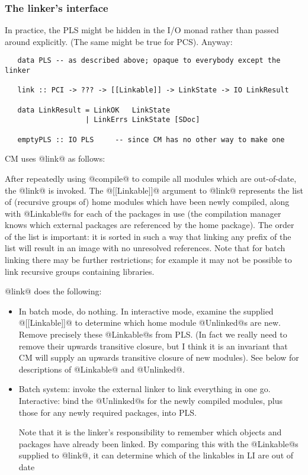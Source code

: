 \documentclass[11pt]{article}
\begin{document}
\subsubsection{The linker's interface}

In practice, the PLS might be hidden in the I/O monad rather
than passed around explicitly.  (The same might be true for PCS).
Anyway:

\begin{verbatim}
   data PLS -- as described above; opaque to everybody except the linker

   link :: PCI -> ??? -> [[Linkable]] -> LinkState -> IO LinkResult

   data LinkResult = LinkOK   LinkState
                   | LinkErrs LinkState [SDoc]

   emptyPLS :: IO PLS     -- since CM has no other way to make one
\end{verbatim}

CM uses @link@ as follows:

After repeatedly using @compile@ to compile all modules which are
out-of-date, the @link@ is invoked.  The @[[Linkable]]@ argument to
@link@ represents the list of (recursive groups of) home modules which
have been newly compiled, along with @Linkable@s for each of
the packages in use (the compilation manager knows which external
packages are referenced by the home package).  The order of the list
is important: it is sorted in such a way that linking any prefix of
the list will result in an image with no unresolved references.  Note
that for batch linking there may be further restrictions; for example
it may not be possible to link recursive groups containing libraries.

@link@ does the following:

\begin{itemize}
  \item 
  In batch mode, do nothing.  In interactive mode,
  examine the supplied @[[Linkable]]@ to determine which home 
  module @Unlinked@s are new.  Remove precisely these @Linkable@s 
  from PLS.  (In fact we really need to remove their upwards
  transitive closure, but I think it is an invariant that CM will
  supply an upwards transitive closure of new modules).
  See below for descriptions of @Linkable@ and @Unlinked@.

  \item 
  Batch system: invoke the external linker to link everything in one go.
  Interactive: bind the @Unlinked@s for the newly compiled modules,
  plus those for any newly required packages, into PLS.

  Note that it is the linker's responsibility to remember which
  objects and packages have already been linked.  By comparing this
  with the @Linkable@s supplied to @link@, it can determine which
  of the linkables in LI are out of date
\end{itemize}
\end{document}
